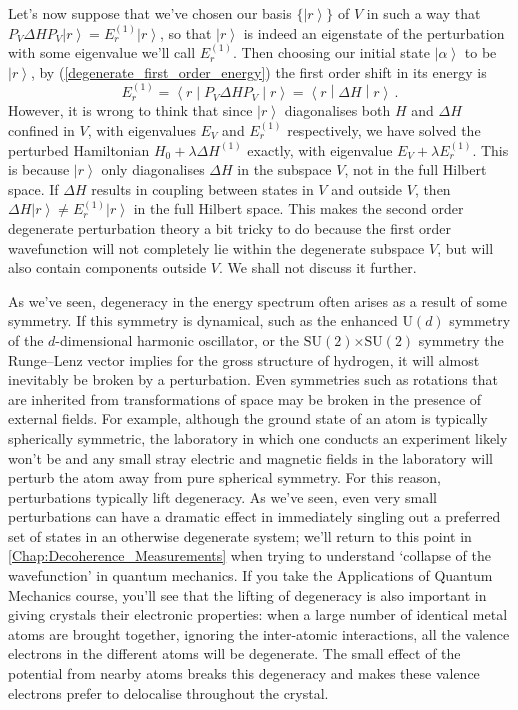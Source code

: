 \documentclass{article}
\theoremstyle{plain}\theoremheaderfont{\normalfont\itshape}\theorembodyfont{\rmfamily}\theoremseparator{.}\newtheorem*{rem}{Remark}\newtheorem*{ex}{Example}\newtheorem*{proof}{Proof}\newtheorem*{altp}{Alternative proof}
\theoremstyle{plain}\theoremheaderfont{\normalfont\bfseries}\theorembodyfont{\rmfamily}\theoremseparator{.}\newtheorem{thm}{Theorem}[section]\newtheorem{lem}[thm]{Lemma}\newtheorem{prop}[thm]{Proposition}\newtheorem*{cor}{Corollary}\newtheorem{defn}[thm]{Definition}\newtheorem{clm}[thm]{Claim}\newtheorem{clminproof}{Claim}
\theoremstyle{break}\theoremheaderfont{\normalfont\itshape}\theorembodyfont{\rmfamily}\theoremseparator{.\medskip}\newtheorem*{proofskip}{Proof}\newtheorem*{exs}{Examples}\newtheorem*{rems}{Remarks}
\theoremstyle{break}\theoremheaderfont{\normalfont\bfseries}\theorembodyfont{\rmfamily}\theoremseparator{.\medskip}\newtheorem{lemskip}[thm]{Lemma}\newtheorem{defnskip}[thm]{Definition}\newtheorem{propskip}[thm]{Proposition}\newtheorem{thmskip}[thm]{Theorem}
\numberwithin{equation}{section}
\newcommand{\ket}[1]{\left| #1 \right\rangle}
\newcommand{\expval}[2]{\left\langle #2 \middle| #1 \middle| #2 \right\rangle}
\newcommand{\cross}{\bm{\times}}
\newcommand{\U}{\mathrm{U}}
\newcommand{\SU}{\mathrm{SU}}
\begin{document}
    Let's now suppose that we've chosen our basis \(\{\ket{r}\}\) of \(V\) in such a way that \(P_V\Delta H P_V\ket{r}=E_r^{(1)}\ket{r}\), so that \(\ket{r}\) is indeed an eigenstate of the perturbation with some eigenvalue we'll call \(E_r^{(1)}\). Then choosing our initial state \(\ket{\alpha}\) to be \(\ket{r}\), by (\ref{degenerate_first_order_energy}) the first order shift in its energy is
    \begin{equation}
        E_r^{(1)}=\expval{P_V \Delta H P_V}{r}=\expval{\Delta H}{r}\,.
    \end{equation}
    However, it is wrong to think that since \(\ket{r}\) diagonalises both \(H\) and \(\Delta H\) confined in \(V\), with eigenvalues \(E_V\) and \(E_r^{(1)}\) respectively, we have solved the perturbed Hamiltonian \(H_0+\lambda\Delta H^{(1)}\) exactly, with eigenvalue \(E_V+\lambda E_r^{(1)}\). This is because \(\ket{r}\) only diagonalises \(\Delta H\) in the subspace \(V\), not in the full Hilbert space. If \(\Delta H\) results in coupling between states in \(V\) and outside \(V\), then \(\Delta H\ket{r}\ne E_r^{(1)}\ket{r}\) in the full Hilbert space. This makes the second order degenerate perturbation theory a bit tricky to do because the first order wavefunction will not completely lie within the degenerate subspace \(V\), but will also contain components outside \(V\). We shall not discuss it further.

    As we've seen, degeneracy in the energy spectrum often arises as a result of some symmetry. If this symmetry is dynamical, such as the enhanced \(\U(d)\) symmetry of the \(d\)-dimensional harmonic oscillator, or the \(\SU(2)\cross \SU(2)\) symmetry the Runge--Lenz vector implies for the gross structure of hydrogen, it will almost inevitably be broken by a perturbation. Even symmetries such as rotations that are inherited from transformations of space may be broken in the presence of external fields. For example, although the ground state of an atom is typically spherically symmetric, the laboratory in which one conducts an experiment likely won't be and any small stray electric and magnetic fields in the laboratory will perturb the atom away from pure spherical symmetry. For this reason, perturbations typically lift degeneracy. As we've seen, even very small perturbations can have a dramatic effect in immediately singling out a preferred set of states in an otherwise degenerate system; we'll return to this point in \cref{Chap:Decoherence_Measurements} when trying to understand `collapse of the wavefunction' in quantum mechanics. If you take the Applications of Quantum Mechanics course, you'll see that the lifting of degeneracy is also important in giving crystals their electronic properties: when a large number of identical metal atoms are brought together, ignoring the inter-atomic interactions, all the valence electrons in the different atoms will be degenerate. The small effect of the potential from nearby atoms breaks this degeneracy and makes these valence electrons prefer to delocalise throughout the crystal.
\end{document}
